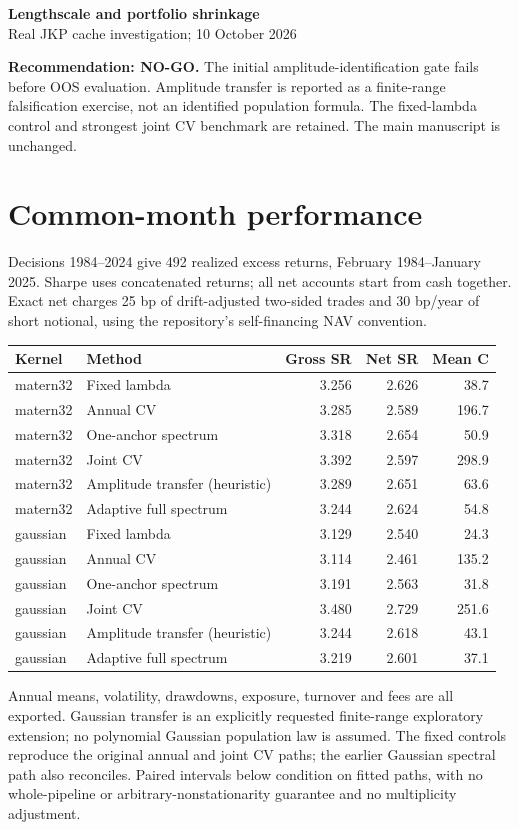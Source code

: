 \documentclass[11pt,letterpaper]{article}
\begin{document}
\begin{center}{\Large\bfseries Lengthscale and portfolio shrinkage}\\
Real JKP cache investigation; 10 October 2026\end{center}
\textbf{Recommendation: NO-GO.} The initial amplitude-identification gate fails before OOS evaluation.
Amplitude transfer is reported as a finite-range falsification exercise, not an
identified population formula. The fixed-lambda control and strongest joint CV
benchmark are retained. The main manuscript is unchanged.

\section*{Common-month performance}
Decisions 1984--2024 give 492 realized excess returns, February 1984--January 2025.
Sharpe uses concatenated returns; all net accounts start from cash together.
Exact net charges 25 bp of drift-adjusted two-sided trades and 30 bp/year of short
notional, using the repository's self-financing NAV convention.
\begin{center}\small\begin{tabular}{llrrr}\toprule
Kernel & Method & Gross SR & Net SR & Mean C\\\midrule
matern32 & Fixed lambda & 3.256 & 2.626 & 38.7\\
matern32 & Annual CV & 3.285 & 2.589 & 196.7\\
matern32 & One-anchor spectrum & 3.318 & 2.654 & 50.9\\
matern32 & Joint CV & 3.392 & 2.597 & 298.9\\
matern32 & Amplitude transfer (heuristic) & 3.289 & 2.651 & 63.6\\
matern32 & Adaptive full spectrum & 3.244 & 2.624 & 54.8\\
gaussian & Fixed lambda & 3.129 & 2.540 & 24.3\\
gaussian & Annual CV & 3.114 & 2.461 & 135.2\\
gaussian & One-anchor spectrum & 3.191 & 2.563 & 31.8\\
gaussian & Joint CV & 3.480 & 2.729 & 251.6\\
gaussian & Amplitude transfer (heuristic) & 3.244 & 2.618 & 43.1\\
gaussian & Adaptive full spectrum & 3.219 & 2.601 & 37.1\\\bottomrule\end{tabular}\end{center}
Annual means, volatility, drawdowns, exposure, turnover and fees are all exported.
Gaussian transfer is an explicitly requested finite-range exploratory extension;
no polynomial Gaussian population law is assumed. The fixed controls reproduce
the original annual and joint CV paths; the earlier Gaussian spectral path also
reconciles. Paired intervals below condition on fitted paths, with no whole-pipeline
or arbitrary-nonstationarity guarantee and no multiplicity adjustment.
\end{document}

